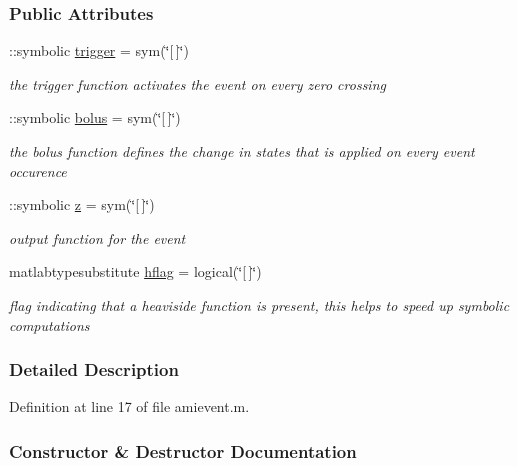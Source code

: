 \subsubsection*{Public Attributes}
\begin{DoxyCompactItemize}
\item 
\+::symbolic \hyperlink{classamievent_ae194cb817eae4085f8023885100c68dd}{trigger} = sym(\char`\"{}\mbox{[}$\,$\mbox{]}\char`\"{})
\begin{DoxyCompactList}\small\item\em the trigger function activates the event on every zero crossing \end{DoxyCompactList}\item 
\+::symbolic \hyperlink{classamievent_ab9227561ac246ee4b70f9e65c25ffda7}{bolus} = sym(\char`\"{}\mbox{[}$\,$\mbox{]}\char`\"{})
\begin{DoxyCompactList}\small\item\em the bolus function defines the change in states that is applied on every event occurence \end{DoxyCompactList}\item 
\+::symbolic \hyperlink{classamievent_a25ed1bcb423b0b7200f485fc5ff71c8e}{z} = sym(\char`\"{}\mbox{[}$\,$\mbox{]}\char`\"{})
\begin{DoxyCompactList}\small\item\em output function for the event \end{DoxyCompactList}\item 
matlabtypesubstitute \hyperlink{classamievent_ab98347b5ce6fbe7bd007030346b88575}{hflag} = logical(\char`\"{}\mbox{[}$\,$\mbox{]}\char`\"{})
\begin{DoxyCompactList}\small\item\em flag indicating that a heaviside function is present, this helps to speed up symbolic computations \end{DoxyCompactList}\end{DoxyCompactItemize}


\subsubsection{Detailed Description}


Definition at line 17 of file amievent.\+m.



\subsubsection{Constructor \& Destructor Documentation}
\hypertarget{classamievent_aa89b0efd53c33a18acf04c1dda76842c}{}
